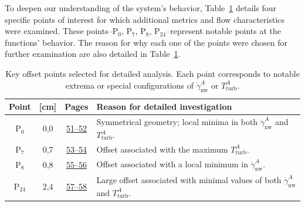 To deepen our understanding of the system’s behavior, Table~\ref{tab:studied points} details four specific points of interest for which additional metrics and flow characteristics were examined. These points--P$_0$, P$_7$, P$_8$, P$_24$--represent notable points at the functions' behavior. The reason for why each one of the points were chosen for further examination are also detailed in Table~\ref{tab:studied points}.
\begin{table}[H]
	\bgroup
	\centering
	\setlength\tabcolsep{3mm}
	\def\arraystretch{2.2}%
	\begin{tabular}{|c|c|c|p{8cm}|}
		\hline
		\textbf{Point} & \boldmath{$o_1$} \textbf{[cm]} & \textbf{Pages} & \textbf{Reason for detailed investigation} \\ \hline
		P$_0$ & 0{,}0 & \hyperlink{page.51}{51--52} & Symmetrical geometry; local minima in both $\dot{\gamma}^{A}_{\mathrm{nw}}$ and $T^{A}_{\mathrm{turb}}$. \\ \hline
		P$_7$ & 0{,}7 & \hyperlink{page.53}{53--54} & Offset associated with the maximum $T^{A}_{\mathrm{turb}}$. \\ \hline
		P$_8$ & 0{,}8 & \hyperlink{page.55}{55--56} &  Offset associated with a local minimum in $\dot{\gamma}^{A}_{\mathrm{nw}}$. \\ \hline
		P$_{24}$ & 2{,}4 & \hyperlink{page.57}{57--58} & Large offset associated with minimal values of both $\dot{\gamma}^{A}_{\mathrm{nw}}$ and $T^{A}_{\mathrm{turb}}$. \\ \hline
	\end{tabular}
	 \caption{Key offset points selected for detailed analysis. Each point corresponds to notable extrema or special configurations of $\dot{\gamma}^{A}_{\mathrm{nw}}$ or $T^{A}_{\mathrm{turb}}$.}
	\label{tab:studied points}
	\egroup
\end{table}



